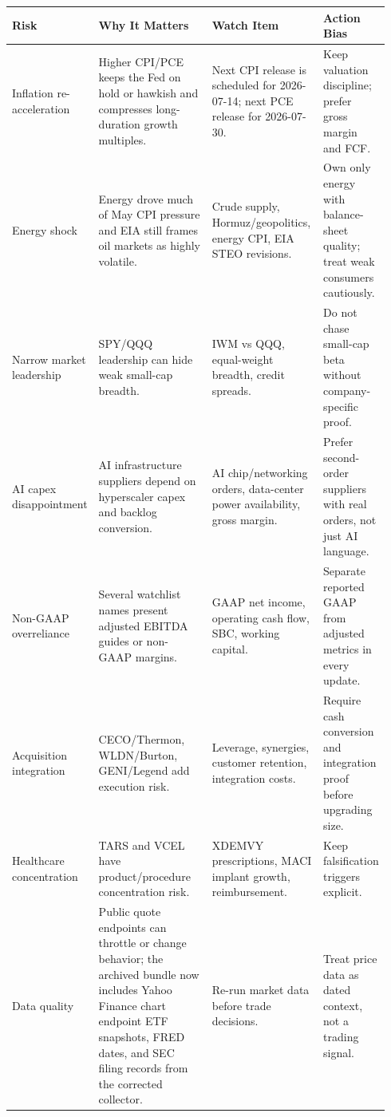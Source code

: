 \documentclass[
  9pt,
]{article}
\begin{document}
\small
\begin{longtable}[]{@{}L{0.18\linewidth}L{0.34\linewidth}L{0.30\linewidth}L{0.12\linewidth}@{}}
\toprule
Risk & Why It Matters & Watch Item & Action Bias \\
\midrule
\endhead
Inflation re-acceleration & Higher CPI/PCE keeps the Fed on hold or
hawkish and compresses long-duration growth multiples. & Next CPI
release is scheduled for 2026-07-14; next PCE release for 2026-07-30. &
Keep valuation discipline; prefer gross margin and FCF. \\
Energy shock & Energy drove much of May CPI pressure and EIA still
frames oil markets as highly volatile. & Crude supply,
Hormuz/geopolitics, energy CPI, EIA STEO revisions. & Own only energy
with balance-sheet quality; treat weak consumers cautiously. \\
Narrow market leadership & SPY/QQQ leadership can hide weak small-cap
breadth. & IWM vs QQQ, equal-weight breadth, credit spreads. & Do not
chase small-cap beta without company-specific proof. \\
AI capex disappointment & AI infrastructure suppliers depend on
hyperscaler capex and backlog conversion. & AI chip/networking orders,
data-center power availability, gross margin. & Prefer second-order
suppliers with real orders, not just AI language. \\
Non-GAAP overreliance & Several watchlist names present adjusted EBITDA
guides or non-GAAP margins. & GAAP net income, operating cash flow, SBC,
working capital. & Separate reported GAAP from adjusted metrics in every
update. \\
Acquisition integration & CECO/Thermon, WLDN/Burton, GENI/Legend add
execution risk. & Leverage, synergies, customer retention, integration
costs. & Require cash conversion and integration proof before upgrading
size. \\
Healthcare concentration & TARS and VCEL have product/procedure
concentration risk. & XDEMVY prescriptions, MACI implant growth,
reimbursement. & Keep falsification triggers explicit. \\
Data quality & Public quote endpoints can throttle or change behavior;
the archived bundle now includes Yahoo Finance chart endpoint ETF
snapshots, FRED dates, and SEC filing records from the corrected
collector. & Re-run market data before trade decisions. & Treat price
data as dated context, not a trading signal. \\
\bottomrule
\end{longtable}
\normalsize
\end{document}
